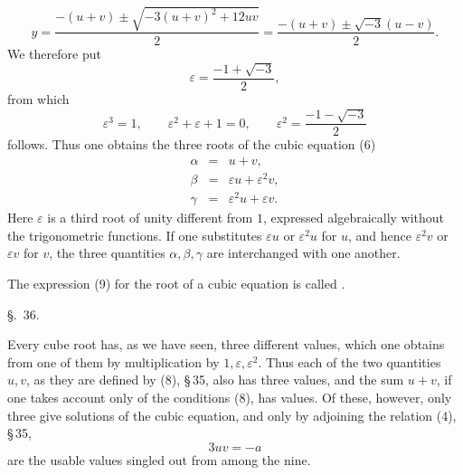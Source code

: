 
\[
 y=\frac{-(u+v)\pm\sqrt{-3(u+v)^2+12uv}}{2}
  =\frac{-(u+v)\pm\sqrt{-3}(u-v)}{2}.
\]
We therefore put
\begin{equation}
\varepsilon=\frac{-1+\sqrt{-3}}{2},
\tag{11}
\end{equation}
from which
\begin{equation}
\varepsilon^3=1,\qquad \varepsilon^2+\varepsilon+1=0,
\qquad
\varepsilon^2=\frac{-1-\sqrt{-3}}{2}
\tag{12}
\end{equation}
follows. Thus one obtains the three roots of the cubic equation (6)
\begin{equation}
\begin{array}{rcl}
\alpha&=&u+v,\\
\beta&=&\varepsilon u+\varepsilon^2v,\\
\gamma&=&\varepsilon^2u+\varepsilon v.
\end{array}
\tag{13}
\end{equation}
Here $\varepsilon$ is a third root of unity different from $1$, expressed algebraically without the trigonometric functions. If one substitutes $\varepsilon u$ or $\varepsilon^2u$ for $u$, and hence $\varepsilon^2v$ or $\varepsilon v$ for $v$, the three quantities $\alpha,\beta,\gamma$ are interchanged with one another.

The expression (9) for the root of a cubic equation is called .

\begin{center}
{\large \S.\ 36.}

\vspace{0.5em}
{\large{}}
\end{center}

Every cube root has, as we have seen, three different values, which one obtains from one of them by multiplication by $1,\varepsilon,\varepsilon^2$. Thus each of the two quantities $u,v$, as they are defined by (8), \S\,35, also has three values, and the sum $u+v$, if one takes account only of the conditions (8), has  values. Of these, however, only three give solutions of the cubic equation, and only by adjoining the relation (4), \S\,35,
\begin{equation}
3uv=-a
\tag{1}
\end{equation}
are the usable values singled out from among the nine.
